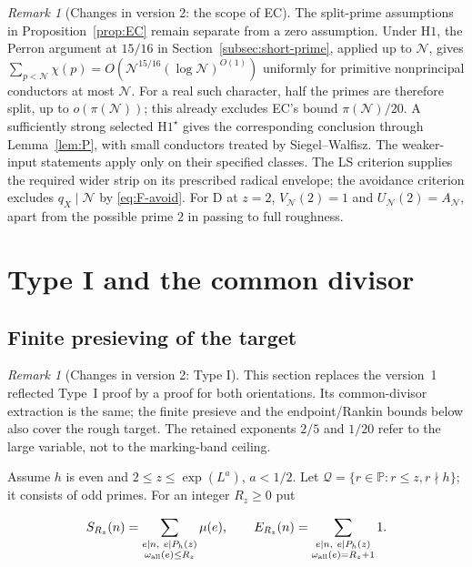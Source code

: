\documentclass[11pt]{article}
\theoremstyle{definition}
\newcommand{\GN}{\mathcal N}
\theoremstyle{remark}
\newtheorem{remark}[theorem]{Remark}
\numberwithin{equation}{section}
\begin{document}
\begin{remark}[Changes in version 2: the scope of EC]
The split-prime assumptions in Proposition~\ref{prop:EC} remain
separate from a zero assumption. Under $\mathrm H1$, the Perron
argument at $15/16$ in Section~\ref{subsec:short-prime}, applied
up to $\GN$, gives
$\sum_{p<\GN}\chi(p)=O(\GN^{15/16}(\log\GN)^{O(1)})$
uniformly for primitive nonprincipal conductors at most $\GN$.
For a real such character, half the primes are therefore split,
up to $o(\pi(\GN))$; this already excludes EC's bound
$\pi(\GN)/20$. A sufficiently strong selected
$\mathrm H1^\star$ gives the corresponding conclusion through
Lemma~\ref{lem:P}, with small conductors treated by
Siegel--Walfisz. The weaker-input statements apply only on their
specified classes. The LS criterion supplies the required wider
strip on its prescribed radical envelope; the avoidance criterion
excludes $q_X\mid\GN$ by \eqref{eq:F-avoid}.
For D at $z=2$, $V_\GN(2)=1$ and $U_\GN(2)=A_\GN$,
apart from the possible prime $2$ in passing to full roughness.
\end{remark}

\section{Type I and the common divisor}\label{sec:typeI}
\subsection{Finite presieving of the target}\label{subsec:presieve}
\begin{remark}[Changes in version 2: Type I]
This section replaces the version~1 reflected Type~I proof by a
proof for both orientations. Its common-divisor extraction is the
same; the finite presieve and the endpoint/Rankin bounds below
also cover the rough target. The retained exponents $2/5$ and
$1/20$ refer to the large variable, not to the marking-band ceiling.
\end{remark}
Assume $h$ is even and $2\le z\le\exp(L^a)$, $a<1/2$. Let $\mathcal Q=\{r\in\mathbb P:r\le z,r\nmid h\}$; it consists of odd primes. For an integer $R_z\ge0$ put


\begin{equation}
S_{R_z}(n)=\sum_{\substack{e\mid n,\ e\mid P_h(z)\\\omega_{\rm all}(e)\le R_z}}\mu(e),\qquad
E_{R_z}(n)=\sum_{\substack{e\mid n,\ e\mid P_h(z)\\\omega_{\rm all}(e)=R_z+1}}1.
\end{equation}
\end{document}

